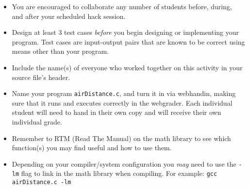 \documentclass[12pt]{scrartcl}
\begin{document}
\begin{itemize}
  \item You are encouraged to collaborate any number of students 
  before, during, and after your scheduled hack session.  
  \item Design at least 3 test cases \emph{before} you begin
  designing or implementing your program.  Test cases are 
  input-output pairs that are known to be correct using means
  other than your program.
  \item Include the name(s) of everyone who worked together on
  this activity in your source file's header.
  \item Name your program \texttt{airDistance.c}, and
  turn it in via webhandin, making sure that it runs and executes
  correctly in the webgrader.  Each individual student will need
  to hand in their own copy and will receive their own individual
  grade.
  \item Remember to RTM (Read The Manual) on the math library
  to see which function(s) you may find useful and how to use 
  them.
  \item Depending on your compiler/system configuration you \emph{may}
  need to use the \texttt{-lm} flag to link in the math
  library when compiling.  For example: 
  \texttt{gcc airDistance.c -lm}
\end{itemize}
  
\end{document}
